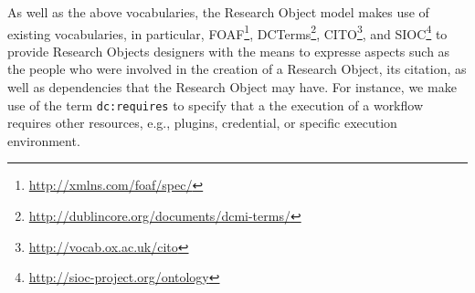 As well as the above vocabularies, the Research Object model makes use of existing vocabularies, in particular, FOAF\footnote{\url{http://xmlns.com/foaf/spec/}}, DCTerms\footnote{\url{http://dublincore.org/documents/dcmi-terms/}}, CITO\footnote{\url{http://vocab.ox.ac.uk/cito}}, and SIOC\footnote{\url{http://sioc-project.org/ontology}} to provide Research Objects designers with the means to expresse aspects such as the people who were involved in the creation of a Research Object, its citation, as well as dependencies that the Research Object may have. For instance, we make use of the term \texttt{dc:requires} to specify that a the execution of a workflow requires other resources, e.g., plugins, credential, or specific execution environment.
